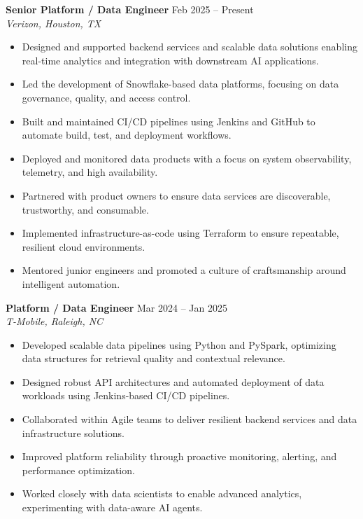 \documentclass[10pt]{article}
\begin{document}
\textbf{Senior Platform / Data Engineer} \hfill Feb 2025 -- Present \\
\textit{Verizon, Houston, TX}
\begin{itemize}[leftmargin=*, itemsep=3pt]
    \item Designed and supported backend services and scalable data solutions enabling real-time analytics and integration with downstream AI applications.
    \item Led the development of Snowflake-based data platforms, focusing on data governance, quality, and access control.
    \item Built and maintained CI/CD pipelines using Jenkins and GitHub to automate build, test, and deployment workflows.
    \item Deployed and monitored data products with a focus on system observability, telemetry, and high availability.
    \item Partnered with product owners to ensure data services are discoverable, trustworthy, and consumable.
    \item Implemented infrastructure-as-code using Terraform to ensure repeatable, resilient cloud environments.
    \item Mentored junior engineers and promoted a culture of craftsmanship around intelligent automation.
\end{itemize}

\textbf{Platform / Data Engineer} \hfill Mar 2024 -- Jan 2025 \\
\textit{T-Mobile, Raleigh, NC}
\begin{itemize}[leftmargin=*, itemsep=3pt]
    \item Developed scalable data pipelines using Python and PySpark, optimizing data structures for retrieval quality and contextual relevance.
    \item Designed robust API architectures and automated deployment of data workloads using Jenkins-based CI/CD pipelines.
    \item Collaborated within Agile teams to deliver resilient backend services and data infrastructure solutions.
    \item Improved platform reliability through proactive monitoring, alerting, and performance optimization.
    \item Worked closely with data scientists to enable advanced analytics, experimenting with data-aware AI agents.
\end{itemize}
\end{document}
